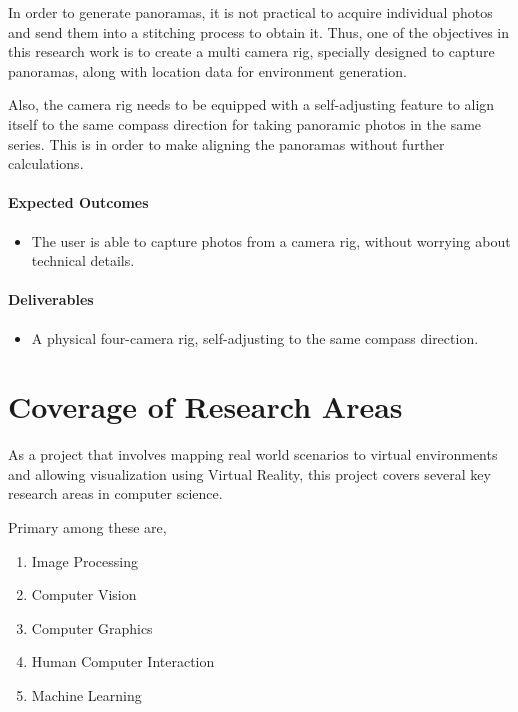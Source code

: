 In order to generate panoramas, it is not practical to acquire individual photos and send them into a stitching process to obtain it. Thus, one of the objectives in this research work is to create a multi camera rig, specially designed to capture panoramas, along with location data for environment generation. 

Also, the camera rig needs to be equipped with a self-adjusting feature to align itself to the same compass direction for taking panoramic photos in the same series. This is in order to make aligning the panoramas without further calculations.

\paragraph{\textbf{Expected Outcomes}}
\begin{itemize}
\item{The user is able to capture photos from a camera rig, without worrying about technical details.}
\end{itemize}

\paragraph{\textbf{Deliverables}}
\begin{itemize}
\item{A physical four-camera rig, self-adjusting to the same compass direction.}
\end{itemize}

\section{Coverage of Research Areas}
\label{intro_sec:4}

As a project that involves mapping real world scenarios to virtual environments and allowing visualization using Virtual Reality, this project covers several key research areas in computer science.

Primary among these are,
\begin{enumerate}
\item{Image Processing}
\item{Computer Vision}
\item{Computer Graphics}
\item{Human Computer Interaction}
\item{Machine Learning}
\end{enumerate}


